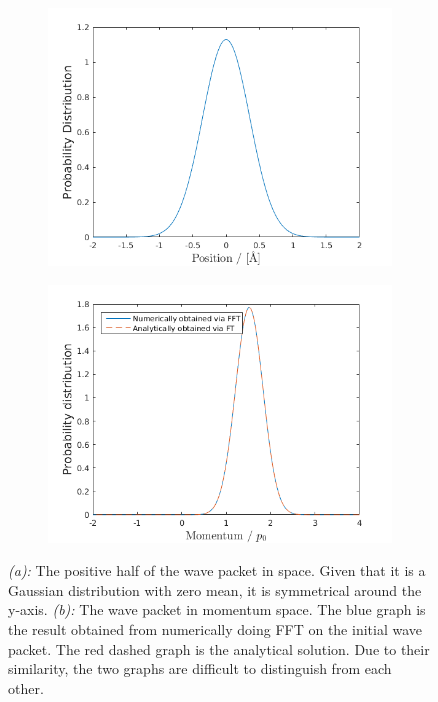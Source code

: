 \begin{figure}[H]
    \centering
    \captionsetup[subfigure]{justification=centering}
    \begin{subfigure}[b]{0.8\textwidth}
        \centering
        \includegraphics[width=\textwidth]{graphics/task1/position_prob.png}
		\caption{}
		\label{fig:1_a}
    \end{subfigure}
    \begin{subfigure}[b]{0.8\textwidth}
        \centering
        \includegraphics[width=\textwidth]{graphics/task1/momentum_prob.png}
        \caption{}
		\label{fig:1_b}
    \end{subfigure}
    \caption{\textit{(a):} The positive half of the wave packet in space. Given that it is a Gaussian distribution with zero mean, it is symmetrical around the y-axis. \textit{(b):} The wave packet in momentum space. The blue graph is the result obtained from numerically doing FFT on the initial wave packet. The red dashed graph is the analytical solution. Due to their similarity, the two graphs are difficult to distinguish from each other.}
    \label{fig:*}
\end{figure}


